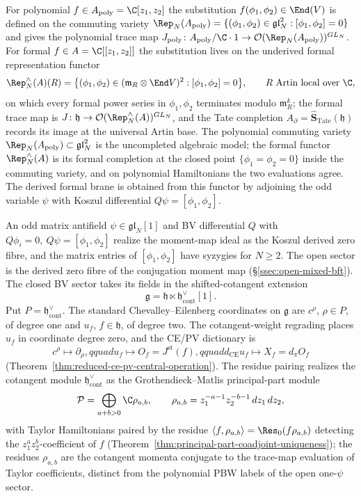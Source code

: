 \documentclass[11pt]{memoir}
\begin{document}
For polynomial \(f\in A_{\mathrm{poly}}=\C[z_1,z_2]\) the substitution
\(f(\phi_1,\phi_2)\in\End(V)\) is defined on the commuting variety
\(\Rep_N(A_{\mathrm{poly}})=\{(\phi_1,\phi_2)\in\mathfrak{gl}_N^2
:[\phi_1,\phi_2]=0\}\) and gives the polynomial trace map
\(J_{\mathrm{poly}}\colon A_{\mathrm{poly}}/\C\cdot1\to
\mathcal O(\Rep_N(A_{\mathrm{poly}}))^{GL_N}\).
For formal \(f\in A=\C[[z_1,z_2]]\) the substitution lives on the
underived formal representation functor
\[
  \Rep_N^{\wedge}(A)(R)=\bigl\{(\phi_1,\phi_2)\in(\mathfrak m_R\otimes\End V)^2
  :[\phi_1,\phi_2]=0\bigr\},
  \qquad R\text{ Artin local over }\C,
\]
on which every formal power series in \(\phi_1,\phi_2\) terminates
modulo \(\mathfrak m_R^k\); the formal trace map is
\(J\colon\mathfrak h\to
\mathcal O(\Rep_N^{\wedge}(A))^{GL_N}\), and the Tate completion
\(A_\partial=\widehat{\mathbf S}_{\mathrm{Tate}}(\mathfrak h)\)
records its image at the universal Artin base.  The polynomial
commuting variety \(\Rep_N(A_{\mathrm{poly}})\subset\mathfrak{gl}_N^2\)
is the uncompleted algebraic model; the formal functor
\(\Rep_N^{\wedge}(A)\) is its formal completion at the closed point
\(\{\phi_1=\phi_2=0\}\) inside the commuting variety, and on polynomial
Hamiltonians the two evaluations agree.  The derived formal brane is
obtained from this functor by adjoining the odd variable \(\psi\) with
Koszul differential \(Q\psi=[\phi_1,\phi_2]\).

An odd matrix antifield \(\psi\in\mathfrak{gl}_N[1]\) and BV
differential \(Q\) with \(Q\phi_i=0,\ Q\psi=[\phi_1,\phi_2]\) realize
the moment-map ideal as the Koszul derived zero fibre, and the
matrix entries of \([\phi_1,\phi_2]\) have syzygies for \(N\ge2\).
The open sector is the derived zero fibre of the conjugation
moment map
(\S\ref{ssec:open-mixed-bft}).  The closed BV sector takes its
fields in the shifted-cotangent extension
\[
  \mathfrak g=\mathfrak h\ltimes\mathfrak h^\vee_{\mathrm{cont}}[1].
\]
Put \(P=\mathfrak h^\vee_{\mathrm{cont}}\).  The standard
Chevalley--Eilenberg coordinates on \(\mathfrak g\) are
\(c^\rho\), \(\rho\in P\), of degree one and \(u_f\),
\(f\in\mathfrak h\), of degree two.  The cotangent-weight regrading
places \(u_f\) in coordinate degree zero, and the CE/PV dictionary is
\[
  c^\rho\longmapsto\partial_\rho,qquad
  u_f\longmapsto O_f=J^{\mathrm{st}}(f),qquad
  d_{\mathrm{CE}}u_f\longmapsto X_f=d_\pi O_f
\]
(Theorem~\ref{thm:reduced-ce-pv-central-operation}).  The residue
pairing realizes the cotangent module
\(\mathfrak h^\vee_{\mathrm{cont}}\) as the Grothendieck--Matlis
principal-part module
\[
  \mathcal P
   =\bigoplus_{a+b>0}\C\rho_{a,b},
   \qquad
   \rho_{a,b}=z_1^{-a-1}z_2^{-b-1}\,dz_1\,dz_2,
\]
with Taylor Hamiltonians paired by the residue
$\langle f,\rho_{a,b}\rangle=\Res_0(f\rho_{a,b})$
detecting the $z_1^az_2^b$-coefficient of $f$
(Theorem~\ref{thm:principal-part-coadjoint-uniqueness}); the
residues $\rho_{a,b}$ are the cotangent momenta conjugate to the
trace-map evaluation of Taylor coefficients, distinct from the
polynomial PBW labels of the open one-$\psi$ sector.
\end{document}
